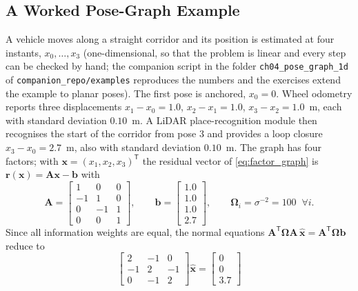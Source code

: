 \documentclass[graybox,envcountchap]{style/SNmono}
\newcommand{\repopath}[1]{\texttt{#1}}
\begin{document}
\subsection{A Worked Pose-Graph Example}
\label{subsec:pose-graph-example}
\begin{example}
\label{ex:pose-graph-1d}
A vehicle moves along a straight corridor and its position is estimated at four instants, $x_0,\ldots,x_3$ (one-dimensional, so that the problem is linear and every step can be checked by hand; the companion script in the folder \repopath{ch04\_\allowbreak pose\_\allowbreak graph\_\allowbreak 1d} of \repopath{companion\_\allowbreak repo/\allowbreak examples} reproduces the numbers and the exercises extend the example to planar poses). The first pose is anchored, $x_0=0$. Wheel odometry reports three displacements $x_1-x_0=1.0$, $x_2-x_1=1.0$, $x_3-x_2=1.0$~m, each with standard deviation $0.10$~m. A LiDAR place-recognition module then recognises the start of the corridor from pose 3 and provides a loop closure $x_3-x_0=2.7$~m, also with standard deviation $0.10$~m. The graph has four factors; with $\mathbf{x}=(x_1,x_2,x_3)^{\mathsf T}$ the residual vector of \eqref{eq:factor_graph} is $\mathbf{r}(\mathbf{x})=\mathbf{A}\mathbf{x}-\mathbf{b}$ with
\begin{equation*}
\mathbf{A}=\begin{bmatrix}1&0&0\\-1&1&0\\0&-1&1\\0&0&1\end{bmatrix},\qquad
\mathbf{b}=\begin{bmatrix}1.0\\1.0\\1.0\\2.7\end{bmatrix},\qquad
\mathbf{\Omega}_i=\sigma^{-2}=100\;\;\forall i .
\end{equation*}
Since all information weights are equal, the normal equations $\mathbf{A}^{\mathsf T}\mathbf{\Omega}\mathbf{A}\,\widehat{\mathbf{x}}=\mathbf{A}^{\mathsf T}\mathbf{\Omega}\mathbf{b}$ reduce to
\begin{equation*}
\begin{bmatrix}2&-1&0\\-1&2&-1\\0&-1&2\end{bmatrix}\widehat{\mathbf{x}}
=\begin{bmatrix}0\\0\\3.7\end{bmatrix}

\end{equation*}
\end{example}
\end{document}
